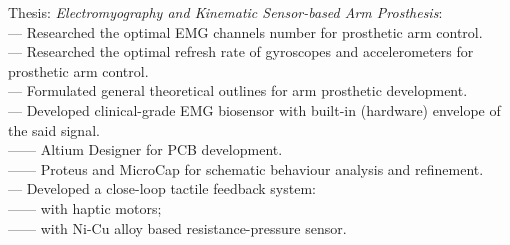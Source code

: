 \begin{itemize}[leftmargin=0in, label={}]
    \small{\item{
        {Thesis: \textit{Electromyography and Kinematic Sensor-based Arm Prosthesis}:}\\
        {— Researched the optimal EMG channels number for prosthetic arm control.}\\
        {— Researched the optimal refresh rate of gyroscopes and accelerometers for prosthetic arm control.}\\
        {— Formulated general theoretical outlines for arm prosthetic development.}\\
        {— Developed clinical-grade EMG biosensor with built-in (hardware) envelope of the said signal.}\\
        {—— Altium Designer for PCB development.}\\
        {—— Proteus and MicroCap for schematic behaviour analysis and refinement.}\\
        {— Developed a close-loop tactile feedback system:}\\
        {—— with haptic motors;}\\
        {—— with Ni-Cu alloy based resistance-pressure sensor.}
    }}
\end{itemize}